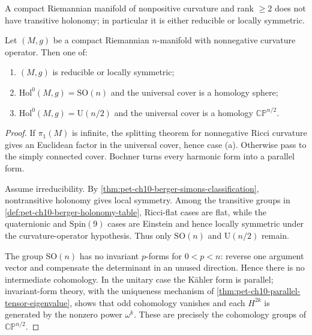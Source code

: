 \begin{theorem}
  \label{thm:pet-ch10-rank-rigidity-nonpositive}
  A compact Riemannian manifold of nonpositive curvature and rank $\ge2$ does
  not have transitive holonomy; in particular it is either reducible or locally
  symmetric.
\end{theorem}

\begin{theorem}
  \label{thm:pet-ch10-gallot-meyer}
  Let $(M,g)$ be a compact Riemannian $n$-manifold with nonnegative curvature
  operator. Then one of:
  \begin{enumerate}
    \item[(a)] $(M,g)$ is reducible or locally symmetric;
    \item[(b)] $\mathrm{Hol}^0(M,g)=\mathrm{SO}(n)$ and the universal cover is a
      homology sphere;
    \item[(c)] $\mathrm{Hol}^0(M,g)=\mathrm U(n/2)$ and the universal cover is a
      homology $\mathbb{CP}^{n/2}$.
  \end{enumerate}
\end{theorem}
\begin{proof}
  \sketch
  If $\pi_1(M)$ is infinite, the splitting theorem for nonnegative Ricci
  curvature gives an Euclidean factor in the universal cover, hence case (a).
  Otherwise pass to the simply connected cover. Bochner turns every harmonic
  form into a parallel form.

  Assume irreducibility. By
  \cref{thm:pet-ch10-berger-simons-classification}, nontransitive holonomy gives
  local symmetry. Among the transitive groups in
  \cref{def:pet-ch10-berger-holonomy-table}, Ricci-flat cases are flat, while
  the quaternionic and $\mathrm{Spin}(9)$ cases are Einstein and hence locally
  symmetric under the curvature-operator hypothesis. Thus only
  $\mathrm{SO}(n)$ and $\mathrm U(n/2)$ remain.

  The group $\mathrm{SO}(n)$ has no invariant $p$-forms for $0<p<n$: reverse
  one argument vector and compensate the determinant in an unused direction.
  Hence there is no intermediate cohomology. In the unitary case the Kähler
  form is parallel; invariant-form theory, with the uniqueness mechanism of
  \cref{thm:pet-ch10-parallel-tensor-eigenvalue}, shows that odd cohomology
  vanishes and each $H^{2k}$ is generated by the nonzero power $\omega^k$.
  These are precisely the cohomology groups of $\mathbb{CP}^{n/2}$.
\end{proof}

